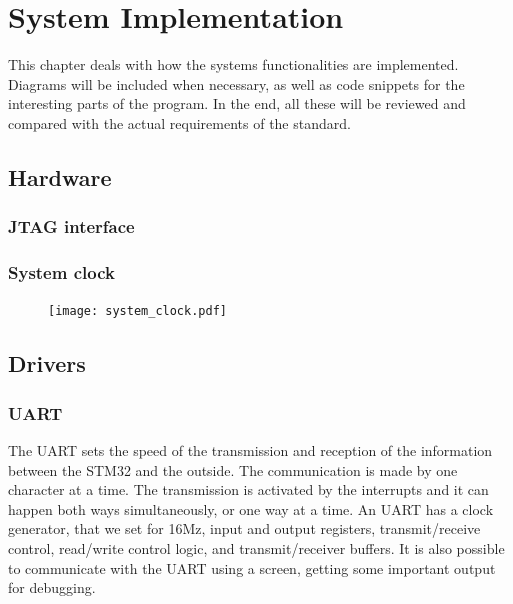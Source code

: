 
\newcommand{\excreturn}{EXC\_RETURN}

\chapter{System Implementation}

This chapter deals with how the system\textquotesingle s functionalities 
are implemented. Diagrams will be included when necessary, as well as code 
snippets for the interesting parts of the program. In the end, all these
will be reviewed and compared with the actual requirements of the standard.


\section{Hardware}

\subsection{JTAG interface}

\subsection{System clock}

\begin{figure}[H]
\centering
\texttt{[image: system\_clock.pdf]}
\label{fig:advanced_system}
\end{figure}

\section{Drivers}

\subsection{UART}

The UART sets the speed of the transmission and reception of the information between the STM32 and the outside. The communication is made by one character at a time. The transmission is activated by the interrupts and it can happen both ways simultaneously, or one way at a time. An UART has a clock generator, that we set for 16Mz, input and output registers, transmit/receive control, read/write control logic, and transmit/receiver buffers.
It is also possible to communicate with the UART using a screen, getting some important output for debugging.

